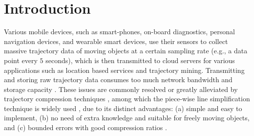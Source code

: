 \section{Introduction}
\label{sec-intro}

Various mobile devices, such as smart-phones, on-board diagnostics, personal navigation devices, and wearable smart devices, use their sensors to collect massive trajectory data of moving objects at a certain sampling rate (e.g., a data point every $5$ seconds), which is then transmitted to cloud servers for various applications such as location based services and trajectory mining.
%
Transmitting and storing raw trajectory data consumes too much network bandwidth and storage capacity \cite{Chen:Trajectory, Meratnia:Spatiotemporal,Shi:Survey, Lin:Operb, Liu:BQS, Liu:Amnesic, Muckell:survey, Muckell:Compression,Cao:Spatio, Popa:Spatio,Nibali:Trajic}. These issues are commonly resolved or greatly alleviated by trajectory compression techniques \cite{Douglas:Peucker, Hershberger:Speeding, Meratnia:Spatiotemporal,Lin:Operb, Liu:BQS, Liu:Amnesic,  Muckell:Compression, Chen:Trajectory, Cao:Spatio,  Nibali:Trajic, Long:Direction, Popa:Spatio, Han:Compress, Chen:Fast}, among which the piece-wise line simplification technique is widely used \cite{Douglas:Peucker, Meratnia:Spatiotemporal,  Muckell:Compression, Chen:Trajectory, Cao:Spatio, Liu:BQS, Liu:Amnesic, Lin:Operb, Chen:Fast}, due to its distinct advantages: (a) simple and easy to implement, (b) no need of extra knowledge and suitable for freely  moving  objects, and (c) bounded errors with good compression ratios \cite{Popa:Spatio,Lin:Operb}.




